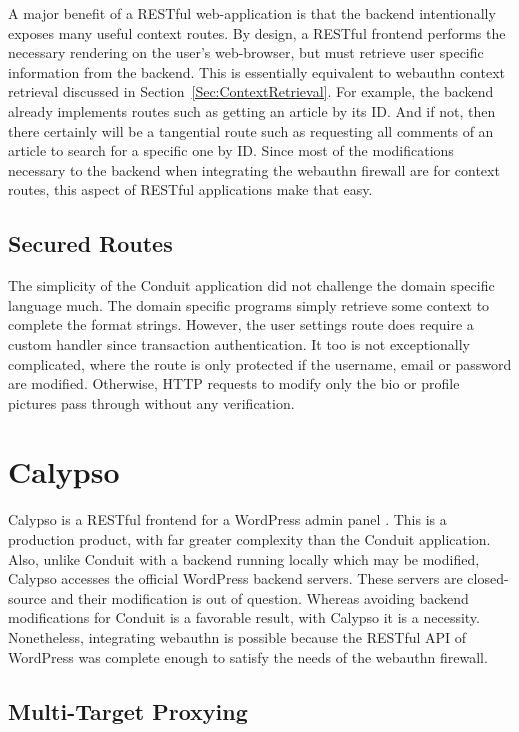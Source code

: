 A major benefit of a RESTful web-application is that the backend intentionally exposes many useful context routes. By design, a RESTful frontend performs the necessary rendering on the user's web-browser, but must retrieve user specific information from the backend. This is essentially equivalent to webauthn context retrieval discussed in Section~\ref{Sec:ContextRetrieval}. For example, the backend already implements routes such as getting an article by its ID. And if not, then there certainly will be a tangential route such as requesting all comments of an article to search for a specific one by ID. Since most of the modifications necessary to the backend when integrating the webauthn firewall are for context routes, this aspect of RESTful applications make that easy.

\subsection{Secured Routes}

The simplicity of the Conduit application did not challenge the domain specific language much. The domain specific programs simply retrieve some context to complete the format strings. However, the user settings route does require a custom handler since transaction authentication. It too is not exceptionally complicated, where the route is only protected if the username, email or password are modified. Otherwise, HTTP requests to modify only the bio or profile pictures pass through without any verification.

\section{Calypso}

Calypso is a RESTful frontend for a WordPress admin panel \cite{TODO-calypso}. This is a production product, with far greater complexity than the Conduit application. Also, unlike Conduit with a backend running locally which may be modified, Calypso accesses the official WordPress backend servers. These servers are closed-source and their modification is out of question. Whereas avoiding backend modifications for Conduit is a favorable result, with Calypso it is a necessity. Nonetheless, integrating webauthn is possible because the RESTful API of WordPress was complete enough to satisfy the needs of the webauthn firewall.

\subsection{Multi-Target Proxying}

